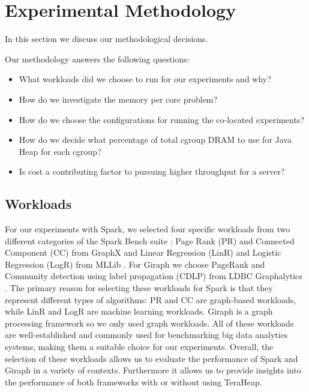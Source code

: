 \section{Experimental Methodology}
\label{sec:method}

In this section we discuss our methodological decisions.

Our methodology answers the following questions:
\begin{itemize}
	\item{What workloads did we choose to run for our experiments and why?}
	\item{How do we investigate the memory per core problem?}
	\item{How do we choose the configurations for running the co-located experiments?}
	\item{How do we decide what percentage of total cgroup DRAM to use for Java Heap for each cgroup?}
	\item{Is cost a contributing factor to pursuing higher throughput for a server?}
\end{itemize}

\subsection{Workloads}
For our experiments with Spark, we selected four specific workloads from two
different categories of the Spark Bench suite \cite{Spark-Bench}: Page Rank (PR) and Connected
Component (CC) from GraphX \cite{GraphX} and Linear Regression (LinR) and Logistic Regression (LogR)
from MLLib \cite{MLLib}. For Giraph we choose PageRank and Community detection 
using label propagation (CDLP) from LDBC Graphalytics \cite{ldbc}. The primary reason for selecting these workloads for Spark is that
they represent different types of algorithms: PR and CC are graph-based workloads, while LinR and LogR are machine learning
workloads. Giraph is a graph processing framework so we only used graph workloads. All of these
workloads are well-established and commonly used for benchmarking big
data analytics systems, making them a suitable choice for our
experiments. Overall, the selection of these workloads allows us to
evaluate the performance of Spark and Giraph in a variety of contexts. Furthermore it allows us to
provide insights into the performance of both frameworks with or without using TeraHeap.


